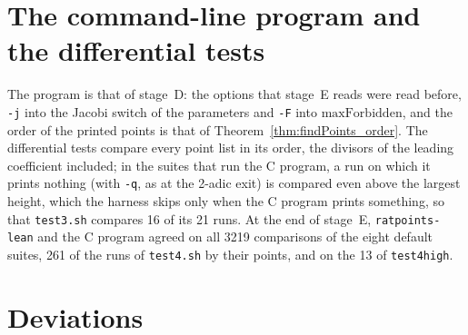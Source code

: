 \section{The command-line program and the differential tests}\label{sec:denCli}

The program is that of stage~D: the options that stage~E reads were read before, \verb|-j| into
the Jacobi switch of the parameters and \verb|-F| into $\mathrm{maxForbidden}$, and the order of the
printed points is that of Theorem~\ref{thm:findPoints_order}. The differential tests compare every
point list in its order, the divisors of the leading coefficient included; in the suites that run
the C program, a run on which it prints nothing (with \verb|-q|, as at the 2-adic exit) is compared
even above the largest height, which the harness skips only when the C program prints something,
so that \verb|test3.sh| compares 16 of its 21 runs. At the end of stage~E, \verb|ratpoints-lean| and
the C program agreed on all 3219 comparisons of the eight default suites, 261 of the runs of
\verb|test4.sh| by their points, and on the 13 of \verb|test4high|.

\section{Deviations}\label{sec:denDeviations}


